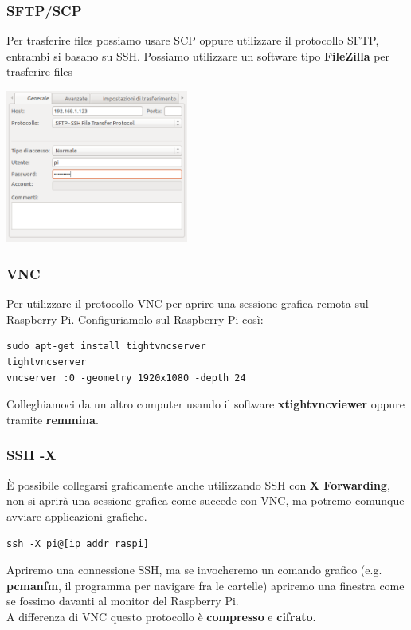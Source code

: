 \documentclass[xcolor=svgnames,11pt]{beamer}
\begin{document}
\begin{frame}\frametitle{SFTP/SCP}
Per trasferire files possiamo usare SCP oppure utilizzare il protocollo SFTP, entrambi si basano su SSH. Possiamo utilizzare un software tipo \textbf{FileZilla} per trasferire files
\medskip
\begin{center}
\includegraphics[width=6cm]{filezilla.png}
\end{center}
\end{frame}

\begin{frame}[fragile]\frametitle{VNC}
Per utilizzare il protocollo VNC per aprire una sessione grafica remota sul Raspberry Pi. Configuriamolo sul Raspberry Pi cos\`i:
\medskip
\begin{block}{}
\begin{verbatim}
sudo apt-get install tightvncserver
tightvncserver
vncserver :0 -geometry 1920x1080 -depth 24
\end{verbatim}
\end{block}
\medskip
Colleghiamoci da un altro computer usando il software \textbf{xtightvncviewer} oppure tramite \textbf{remmina}.
\end{frame}

\begin{frame}\frametitle{SSH -X}
\`E possibile collegarsi graficamente anche utilizzando SSH con \textbf{X Forwarding}, non si aprir\`a una sessione grafica come succede con VNC, ma potremo comunque avviare applicazioni grafiche.
\medskip
\begin{block}{}
\begin{center}
\texttt{ssh -X pi@[ip\_addr\_raspi]}
\end{center}
\end{block}

\medskip
Apriremo una connessione SSH, ma se invocheremo un comando grafico (e.g. \textbf{pcmanfm}, il programma per navigare fra le cartelle) apriremo una finestra come se fossimo davanti al monitor del Raspberry Pi. \\
\medskip
A differenza di VNC questo protocollo \`e \textbf{compresso} e \textbf{cifrato}.
\end{frame}
\end{document}
